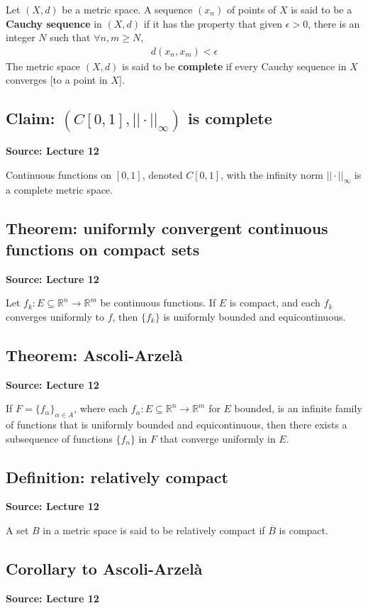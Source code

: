 \documentclass[11pt]{article}
\newcommand{\R}{\mathbb{R}}
\begin{document}
Let $(X,d)$ be a metric space. A sequence $(x_n)$ of points of $X$ is said to be a \textbf{Cauchy sequence} in $(X,d)$ if it has the property that given $\epsilon > 0$, there is an integer $N$ such that $\forall n, m \geq N$, 
\begin{align*}
    d(x_n, x_m) < \epsilon
\end{align*}
The metric space $(X,d)$ is said to be \textbf{complete} if every Cauchy sequence in $X$ converges [to a point in $X$]. 

\subsection{Claim: $(C[0,1], ||\cdot||_\infty)$ is complete}
\textbf{Source: Lecture 12}

Continuous functions on $[0,1]$, denoted $C[0,1]$, with the infinity norm $|| \cdot ||_\infty$ is a complete metric space. 

\subsection{Theorem: uniformly convergent continuous functions on compact sets} 
\textbf{Source: Lecture 12}

Let $f_k: E \subseteq \R^n \to \R^m$ be continuous functions. If $E$ is compact, and each $f_k$ converges uniformly to $f$, then $\{f_k\}$ is uniformly bounded and equicontinuous. 

\subsection{Theorem: Ascoli-Arzelà}
\textbf{Source: Lecture 12}

If $F = \{f_\alpha\}_{\alpha \in A}$, where each $f_\alpha: E \subseteq \R^n \to \R^m$ for $E$ bounded, is an infinite family of functions that is uniformly bounded and equicontinuous, then there exists a subsequence of functions $\{f_n\}$ in $F$ that converge uniformly in $E$. 

\subsection{Definition: relatively compact}
\textbf{Source: Lecture 12}

A set $B$ in a metric space is said to be relatively compact if $\overline{B}$ is compact. 

\subsection{Corollary to Ascoli-Arzelà} 
\textbf{Source: Lecture 12}
\end{document}

